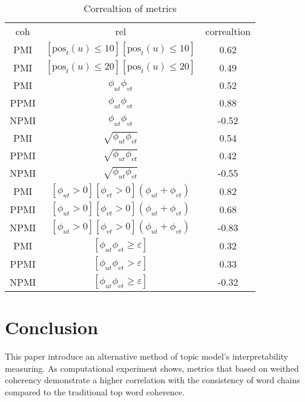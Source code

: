\documentclass{article}
\begin{document}
\begin{table}[h]
    \centering
    \begin{tabular}{ccc}
        coh & rel & correaltion \\
        PMI & $[\text{pos}_t(u) \le 10][\text{pos}_t(u) \le 10]$ & 0.62 \\
        PMI & $[\text{pos}_t(u) \le 20][\text{pos}_t(u) \le 20]$ & 0.49 \\
        PMI & $\phi_{ut} \phi_{vt}$ & 0.52 \\
        PPMI & $\phi_{ut} \phi_{vt}$ & 0.88 \\
        NPMI & $\phi_{ut} \phi_{vt}$ & -0.52 \\
        PMI & $\sqrt{\phi_{ut} \phi_{vt}}$ & 0.54 \\
        PPMI & $\sqrt{\phi_{ut} \phi_{vt}}$ & 0.42 \\
        NPMI & $\sqrt{\phi_{ut} \phi_{vt}}$ & 
        -0.55 \\
        PMI & $[\phi_{ut} > 0] [\phi_{vt} > 0] (\phi_{ut} + \phi_{vt})$ & 0.82 \\
        PPMI & $[\phi_{ut} > 0] [\phi_{vt} > 0] (\phi_{ut} + \phi_{vt})$ & 0.68 \\
        NPMI & $[\phi_{ut} > 0] [\phi_{vt} > 0] (\phi_{ut} + \phi_{vt})$ & 
        -0.83 \\
        PMI & $[\phi_{ut} \phi_{vt} \ge \varepsilon]$ & 0.32 \\
        PPMI & $[\phi_{ut} \phi_{vt} > \varepsilon]$ & 0.33 \\
        NPMI & $[\phi_{ut} \phi_{vt} \ge \varepsilon]$ & -0.32 \\
    \end{tabular}

    \caption{Correaltion of metrics}
    \label{tab:my_label}
\end{table}

\section{Conclusion}
This paper introduce an alternative method of topic model's interpretability measuring. 
As computational experiment shows, metrics that based on weithed coherency demonstrate  a higher correlation with the consistency of word chains compared to the traditional top word coherence. 



\end{document}
